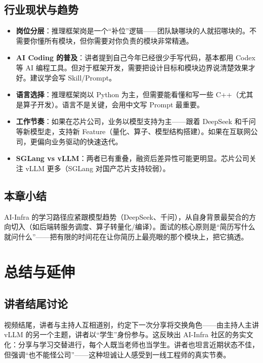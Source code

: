 \documentclass[a4paper]{article}
\begin{document}
\subsection{行业现状与趋势}

\begin{itemize}
    \item \textbf{岗位分层}：推理框架岗是一个``补位''逻辑——团队缺哪块的人就招哪块的。不需要你懂所有模块，但你需要对你负责的模块非常精通。
    \item \textbf{AI Coding 的普及}：讲者提到自己今年已经很少手写代码，基本都用 Codex 等 AI 编程工具。但对于框架开发，需要把设计目标和模块边界说清楚效果才好。建议学会写 Skill/Prompt。
    \item \textbf{语言选择}：推理框架岗以 Python 为主，但需要能看懂和写一些 C++（尤其是算子开发）。语言不是关键，会用中文写 Prompt 最重要。
    \item \textbf{工作节奏}：如果在芯片公司，业务以模型支持为主——跟着 DeepSeek 和千问等新模型走，支持新 Feature（量化、算子、模型结构搭建）。如果在互联网公司，更偏向业务驱动的快速迭代。
    \item \textbf{SGLang vs vLLM}：两者已有重叠，融资后差异性可能更明显。芯片公司关注 vLLM 更多（SGLang 对国产芯片支持较弱）。
\end{itemize}

\subsection{本章小结}

AI-Infra 的学习路径应紧跟模型趋势（DeepSeek、千问），从自身背景最契合的方向切入（如后端转服务调度、算子转量化/编译）。面试的核心原则是``简历写什么就问什么''——把有限的时间花在让你简历上最亮眼的那个模块上，把它搞透。

\section{总结与延伸}

\subsection{讲者结尾讨论}

视频结尾，讲者与主持人互相道别，约定下一次分享将交换角色——由主持人主讲 vLLM 的另一个主题，讲者以``学生''身份参与。这反映出 AI-Infra 社区的务实文化：分享与学习交替进行，每个人既当老师也当学生。讲者也坦言近期状态不佳，但强调``也不能怪公司''——这种坦诚让人感受到一线工程师的真实节奏。
\end{document}
